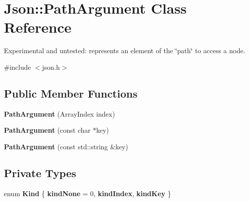 \hypertarget{class_json_1_1_path_argument}{\section{Json\-:\-:Path\-Argument Class Reference}
\label{class_json_1_1_path_argument}
}


Experimental and untested\-: represents an element of the \char`\"{}path\char`\"{} to access a node.  




{\ttfamily \#include $<$json.\-h$>$}

\subsection*{Public Member Functions}
\begin{DoxyCompactItemize}
\item 
\hypertarget{class_json_1_1_path_argument_a53c5b27143b161301b95fd544c139ecf}{{\bfseries Path\-Argument} (Array\-Index index)}\label{class_json_1_1_path_argument_a53c5b27143b161301b95fd544c139ecf}

\item 
\hypertarget{class_json_1_1_path_argument_a9690417a8a40e6e49f2acdf6c9281345}{{\bfseries Path\-Argument} (const char $\ast$key)}\label{class_json_1_1_path_argument_a9690417a8a40e6e49f2acdf6c9281345}

\item 
\hypertarget{class_json_1_1_path_argument_a08f872cfee4fc600f7fa3bcaaff0d41c}{{\bfseries Path\-Argument} (const std\-::string \&key)}\label{class_json_1_1_path_argument_a08f872cfee4fc600f7fa3bcaaff0d41c}

\end{DoxyCompactItemize}
\subsection*{Private Types}
\begin{DoxyCompactItemize}
\item 
enum {\bfseries Kind} \{ {\bfseries kind\-None} = 0, 
{\bfseries kind\-Index}, 
{\bfseries kind\-Key}
 \}
\end{DoxyCompactItemize}
